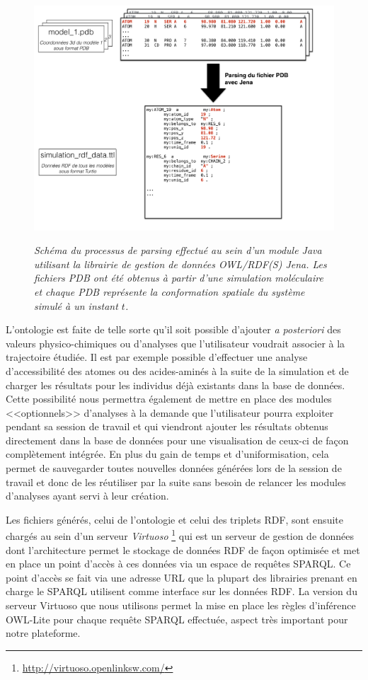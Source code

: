 \begin{figure}
  \centering
  {\includegraphics[width=.75\linewidth]{./figures/ch5/pdb_parsing_to_ttl.pdf}}
    \caption[Processus de traitement de fichiers PDB par Jena, plugin Java.]{{\it Schéma du processus de parsing effectué au sein d'un module Java utilisant la librairie de gestion de données OWL/RDF(S) Jena. Les fichiers PDB ont été obtenus à partir d'une simulation moléculaire et chaque PDB représente la conformation spatiale du système simulé à un instant $t$.}}
  \label{Fig:pdb_parsing_to_ttl}
  \hspace{0.3cm}
\end{figure}

L'ontologie est faite de telle sorte qu'il soit possible d'ajouter \textit{a posteriori} des valeurs physico-chimiques ou d'analyses que l'utilisateur voudrait associer à la trajectoire étudiée. Il est par exemple possible d'effectuer une analyse d'accessibilité des atomes ou des acides-aminés à la suite de la simulation et de charger les résultats pour les individus déjà existants dans la base de données. Cette possibilité nous permettra également de mettre en place des modules <<optionnels>> d'analyses à la demande que l'utilisateur pourra exploiter pendant sa session de travail et qui viendront ajouter les résultats obtenus directement dans la base de données pour une visualisation de ceux-ci de façon complètement intégrée. En plus du gain de temps et d'uniformisation, cela permet de sauvegarder toutes nouvelles données générées lors de la session de travail et donc de les réutiliser par la suite sans besoin de relancer les modules d'analyses ayant servi à leur création.

Les fichiers générés, celui de l'ontologie et celui des triplets RDF, sont ensuite chargés au sein d'un serveur \textit{Virtuoso} \footnote{\url{http://virtuoso.openlinksw.com/}} qui est un serveur de gestion de données dont l'architecture permet le stockage de données RDF de façon optimisée et met en place un point d'accès à ces données via un espace de requêtes SPARQL. Ce point d'accès se fait via une adresse URL que la plupart des librairies prenant en charge le SPARQL utilisent comme interface sur les données RDF. La version du serveur Virtuoso que nous utilisons permet la mise en place les règles d'inférence OWL-Lite pour chaque requête SPARQL effectuée, aspect très important pour notre plateforme.


